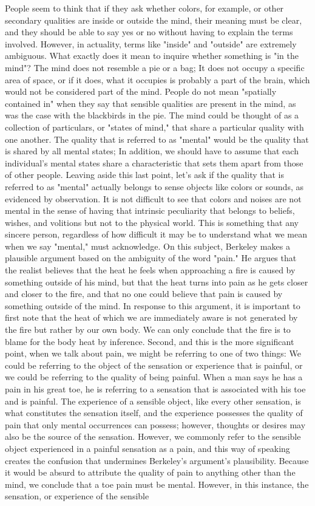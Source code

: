 \documentclass[a4paper,12pt]{book}[2004/02/16]
\theoremstyle{ilemma}
\theoremstyle{itheorem}
\theoremstyle{iother}
\theoremstyle{icorollary}
\theoremstyle{numcorollary}
\theoremstyle{idefinition}
\begin{document}
People seem to think that if they ask whether colors, for example, or other secondary qualities are inside or outside the mind, their meaning must be clear, and they should be able to say yes or no without having to explain the terms involved. However, in actuality, terms like "inside" and "outside" are extremely ambiguous.
What exactly does it mean to inquire whether something is "in the mind"? The mind does not resemble a pie or a bag; It does not occupy a specific area of space, or if it does, what it occupies is probably a part of the brain, which would not be considered part of the mind. People do not mean "spatially contained in" when they say that sensible qualities are present in the mind, as was the case with the blackbirds in the pie. The mind could be thought of as a collection of particulars, or "states of mind," that share a particular quality with one another. The quality that is referred to as "mental" would be the quality that is shared by all mental states; In addition, we should have to assume that each individual's mental states share a characteristic that sets them apart from those of other people. Leaving aside this last point, let's ask if the quality that is referred to as "mental" actually belongs to sense objects like colors or sounds, as evidenced by observation. It is not difficult to see that colors and noises are not mental in the sense of having that intrinsic peculiarity that belongs to beliefs, wishes, and volitions but not to the physical world. This is something that any sincere person, regardless of how difficult it may be to understand what we mean when we say "mental," must acknowledge. On this subject, Berkeley makes a plausible argument based on the ambiguity of the word "pain." He argues that the realist believes that the heat he feels when approaching a fire is caused by something outside of his mind, but that the heat turns into pain as he gets closer and closer to the fire, and that no one could believe that pain is caused by something outside of the mind. In response to this argument, it is important to first note that the heat of which we are immediately aware is not generated by the fire but rather by our own body. We can only conclude that the fire is to blame for the body heat by inference. Second, and this is the more significant point, when we talk about pain, we might be referring to one of two things: We could be referring to the object of the sensation or experience that is painful, or we could be referring to the quality of being painful. When a man says he has a pain in his great toe, he is referring to a sensation that is associated with his toe and is painful. The experience of a sensible object, like every other sensation, is what constitutes the sensation itself, and the experience possesses the quality of pain that only mental occurrences can possess; however, thoughts or desires may also be the source of the sensation. However, we commonly refer to the sensible object experienced in a painful sensation as a pain, and this way of speaking creates the confusion that undermines Berkeley's argument's plausibility. Because it would be absurd to attribute the quality of pain to anything other than the mind, we conclude that a toe pain must be mental. However, in this instance, the sensation, or experience of the sensible 
\end{document}
